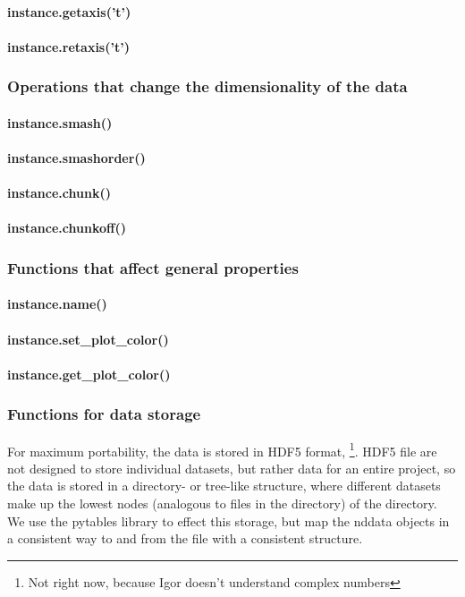 \paragraph{instance.getaxis('t')}
\paragraph{instance.retaxis('t')}
\subsubsection{Operations that change the dimensionality of the data}
\paragraph{instance.smash()}
\paragraph{instance.smashorder()}
\paragraph{instance.chunk()}
\paragraph{instance.chunkoff()}
\subsubsection{Functions that affect general properties}
\paragraph{instance.name()}
\paragraph{instance.set\_plot\_color()}
\paragraph{instance.get\_plot\_color()}
\subsubsection{Functions for data storage}
For maximum portability, the data is stored in HDF5 format, \footnote{Not right now, because Igor doesn't understand complex numbers}.
HDF5 file are not designed to store individual datasets, but rather data for an entire project, so the data is stored in a directory- or tree-like structure, where different datasets make up the lowest nodes (analogous to files in the directory) of the directory. 
We use the pytables library to effect this storage, but map the nddata objects in a consistent way to and from the file with a consistent structure.
